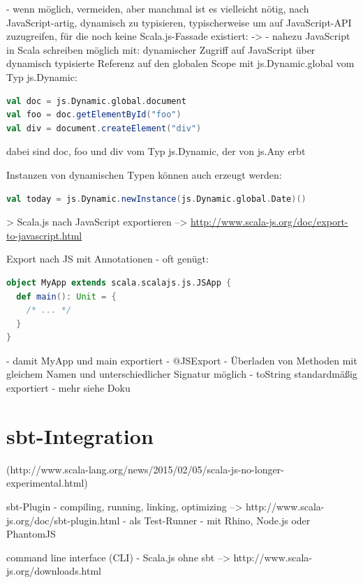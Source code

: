 \documentclass[a4paper, 12pt, hidelinks, listof=totoc, listoftables=totoc, bibliography=totoc]{scrreprt}
\begin{document}
- wenn möglich, vermeiden, aber manchmal ist es vielleicht nötig, nach JavaScript-artig, dynamisch zu typisieren, typischerweise um auf JavaScript-API zuzugreifen, für die noch keine Scala.js-Fassade existiert: ->
- nahezu JavaScript in Scala schreiben möglich mit: dynamischer Zugriff auf JavaScript über dynamisch typisierte Referenz auf den globalen Scope mit js.Dynamic.global vom Typ js.Dynamic:
\begin{lstlisting}[language=Scala]
val doc = js.Dynamic.global.document
val foo = doc.getElementById("foo")
val div = document.createElement("div")
\end{lstlisting}
dabei sind doc, foo und div vom Typ js.Dynamic, der von js.Any erbt


Instanzen von dynamischen Typen können auch erzeugt werden:
\begin{lstlisting}[language=Scala]
val today = js.Dynamic.newInstance(js.Dynamic.global.Date)()
\end{lstlisting}



> Scala.js nach JavaScript exportieren
	-->  \url{http://www.scala-js.org/doc/export-to-javascript.html}

Export nach JS mit Annotationen
- oft genügt:
\begin{lstlisting}[language=Scala]
object MyApp extends scala.scalajs.js.JSApp {
  def main(): Unit = {
  	/* ... */
  }
}
\end{lstlisting}
	- damit MyApp und main exportiert
- @JSExport
	- Überladen von Methoden mit gleichem Namen und unterschiedlicher Signatur möglich
- toString standardmäßig exportiert
- mehr siehe Doku









\section{sbt-Integration}

(http://www.scala-lang.org/news/2015/02/05/scala-js-no-longer-experimental.html)

sbt-Plugin
  - compiling, running, linking, optimizing --> http://www.scala-js.org/doc/sbt-plugin.html
  - als Test-Runner - mit Rhino, Node.js oder PhantomJS

command line interface (CLI)
  - Scala.js ohne sbt  -->  http://www.scala-js.org/downloads.html
\end{document}
